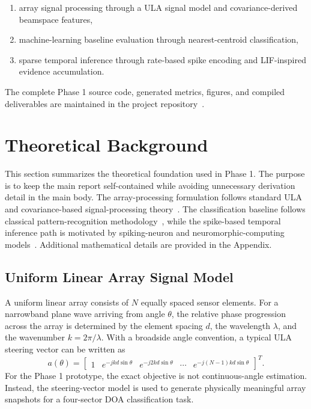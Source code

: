 \documentclass[11pt]{article}
\begin{document}
\begin{enumerate}[label=\arabic*.]
    \item array signal processing through a ULA signal model and covariance-derived beamspace features,
    \item machine-learning baseline evaluation through nearest-centroid classification,
    \item sparse temporal inference through rate-based spike encoding and LIF-inspired evidence accumulation.
\end{enumerate}

The complete Phase 1 source code, generated metrics, figures, and compiled deliverables are maintained in the project repository~\cite{molhem2026embeddedai}.

\section{Theoretical Background}

This section summarizes the theoretical foundation used in Phase 1. The purpose is to keep the main report self-contained while avoiding unnecessary derivation detail in the main body. The array-processing formulation follows standard ULA and covariance-based signal-processing theory~\cite{vantrees2002optimum,haykin2014adaptive}. The classification baseline follows classical pattern-recognition methodology~\cite{duda2001pattern}, while the spike-based temporal inference path is motivated by spiking-neuron and neuromorphic-computing models~\cite{maass1997networks,gerstner2002spiking,roy2019towards}. Additional mathematical details are provided in the Appendix.

\subsection{Uniform Linear Array Signal Model}

A uniform linear array consists of $N$ equally spaced sensor elements. For a narrowband plane wave arriving from angle $\theta$, the relative phase progression across the array is determined by the element spacing $d$, the wavelength $\lambda$, and the wavenumber $k=2\pi/\lambda$. With a broadside angle convention, a typical ULA steering vector can be written as~\cite{vantrees2002optimum}
\begin{equation}
    a(\theta)
    =
    \begin{bmatrix}
    1 & e^{-jkd\sin\theta} & e^{-j2kd\sin\theta} & \cdots & e^{-j(N-1)kd\sin\theta}
    \end{bmatrix}^{T}.
\end{equation}
For the Phase 1 prototype, the exact objective is not continuous-angle estimation. Instead, the steering-vector model is used to generate physically meaningful array snapshots for a four-sector DOA classification task.
\end{document}
